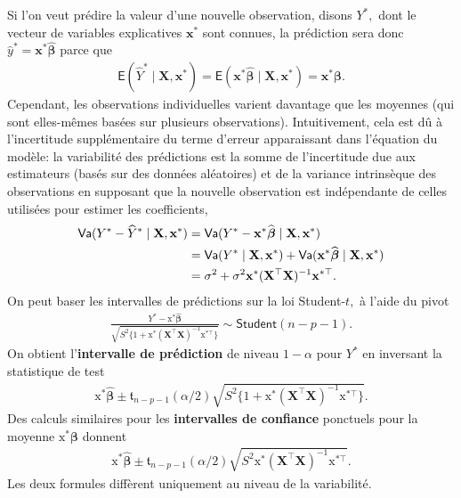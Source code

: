 \documentclass[
  11pt,
  letterpaper,
]{scrbook}
\theoremstyle{plain}
\theoremstyle{plain}
\theoremstyle{definition}
\theoremstyle{definition}
\theoremstyle{remark}
\begin{document}
Si l'on veut prédire la valeur d'une nouvelle observation, disons
\(Y^*,\) dont le vecteur de variables explicatives \(\mathbf{x}^*\) sont
connues, la prédiction sera donc
\(\widehat{y}^* = \mathbf{x}^*\widehat{\boldsymbol{\beta}}\) parce que
\begin{align*}
\mathsf{E}(\widehat{Y}^* \mid \mathbf{X}, \mathbf{x}^*) = \mathsf{E}(\mathbf{x}^*\widehat{\boldsymbol{\beta}}\mid \mathbf{X}, \mathbf{x}^*) = \mathbf{x}^*\boldsymbol{\beta}.
\end{align*} Cependant, les observations individuelles varient davantage
que les moyennes (qui sont elles-mêmes basées sur plusieurs
observations). Intuitivement, cela est dû à l'incertitude supplémentaire
du terme d'erreur apparaissant dans l'équation du modèle: la variabilité
des prédictions est la somme de l'incertitude due aux estimateurs (basés
sur des données aléatoires) et de la variance intrinsèque des
observations en supposant que la nouvelle observation est indépendante
de celles utilisées pour estimer les coefficients, \begin{align*}
\mathsf{Va}(Y^*-\widehat{Y}^* \mid \mathbf{X}, \mathbf{x}^*) &= \mathsf{Va}(Y^*  - \mathbf{x}^*\widehat{\boldsymbol{\beta}} \mid \mathbf{X}, \mathbf{x}^*)
\\&=\mathsf{Va}(Y^* \mid \mathbf{X}, \mathbf{x}^*) + \mathsf{Va}(\mathbf{x}^*\widehat{\boldsymbol{\beta}} \mid \mathbf{X}, \mathbf{x}^*)
\\& = \sigma^2 + \sigma^2\mathbf{x}^{*\vphantom{\top}}(\mathbf{X}^\top\mathbf{X})^{-1}\mathbf{x}^{*\top}.
\end{align*} On peut baser les intervalles de prédictions sur la loi
Student-\(t,\) à l'aide du pivot \begin{align*}
\frac{Y^*-\mathrm{x}^*\widehat{\boldsymbol{\beta}}}{\sqrt{S^2\{1+\mathrm{x}^*(\mathbf{X}^\top\mathbf{X})^{-1}\mathrm{x}^{*\top}\}}}\sim \mathsf{Student}(n-p-1).
\end{align*} On obtient l'\textbf{intervalle de prédiction} de niveau
\(1-\alpha\) pour \(Y^*\) en inversant la statistique de test
\begin{align*}
\mathrm{x}^*\widehat{\boldsymbol{\beta}}\pm \mathfrak{t}_{n-p-1}(\alpha/2)\sqrt{S^2\{1+\mathrm{x}^*(\mathbf{X}^\top\mathbf{X})^{-1}\mathrm{x}^{*\top}\}}.
\end{align*} Des calculs similaires pour les \textbf{intervalles de
confiance} ponctuels pour la moyenne \(\mathrm{x}^*\boldsymbol{\beta}\)
donnent \begin{align*}
\mathrm{x}^*\widehat{\boldsymbol{\beta}}\pm \mathfrak{t}_{n-p-1}(\alpha/2)\sqrt{S^2\mathrm{x}^*(\mathbf{X}^\top\mathbf{X})^{-1}\mathrm{x}^{*\top}}.
\end{align*} Les deux formules diffèrent uniquement au niveau de la
variabilité.
\end{document}
